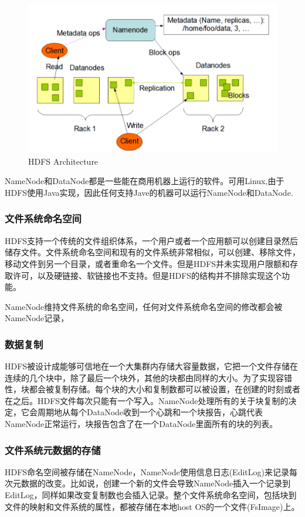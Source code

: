 \documentclass[UTF8]{ctexart}
\begin{document}
\begin{figure}[h]
\centering
\includegraphics{HDFS_Arch.PNG}
\caption{HDFS Architecture}
\label{fig:HDFS_Arch}
\end{figure}

NameNode和DataNode都是一些能在商用机器上运行的软件。可用Linux,由于HDFS使用Java实现，因此任何支持Jave的机器可以运行NameNode和DataNode.

\subsubsection{文件系统命名空间}
HDFS支持一个传统的文件组织体系，一个用户或者一个应用额可以创建目录然后储存文件。文件系统命名空间和现有的文件系统非常相似，可以创建、移除文件，移动文件到另一个目录，或者重命名一个文件。但是HDFS并未实现用户限额和存取许可，以及硬链接、软链接也不支持。但是HDFS的结构并不排除实现这个功能。

NameNode维持文件系统的命名空间，任何对文件系统命名空间的修改都会被NameNode记录，

\subsubsection{数据复制}
HDFS被设计成能够可信地在一个大集群内存储大容量数据，它把一个文件存储在连续的几个块中，除了最后一个块外，其他的块都由同样的大小。为了实现容错性，块都会被复制存储。每个块的大小和复制数都可以被设置，在创建的时刻或者在之后。HDFS文件每次只能有一个写入。NameNode处理所有的关于块复制的决定，它会周期地从每个DataNode收到一个心跳和一个块报告，心跳代表NameNode正常运行，块报告包含了在一个DataNode里面所有的块的列表。

\subsubsection{文件系统元数据的存储}
HDFS命名空间被存储在NameNode，NameNode使用信息日志(EditLog)来记录每次元数据的改变。比如说，创建一个新的文件会导致NameNode插入一个记录到EditLog，同样如果改变复制数也会插入记录。整个文件系统命名空间，包括块到文件的映射和文件系统的属性，都被存储在本地host OS的一个文件(FsImage)上。
\end{document}
